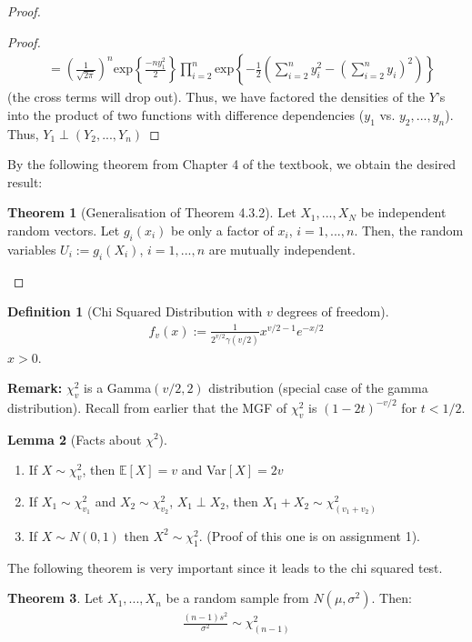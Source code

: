\documentclass[11pt]{scrartcl}
\theoremstyle{definition}
\newtheorem{theorem}{Theorem}
\newtheorem{lemma}[theorem]{Lemma}
\newtheorem{definition}{Definition}
\theoremstyle{remark}
\newcommand{\EX}[1]{\mathbb{E}\left[#1 \right]}
\begin{document}
{\begin{proof}
\begin{proof}
\begin{align*}
			& = \left( 	\frac{1}{\sqrt{2 \pi}}	\right)^n \text{exp} \left\{ 	\frac{-n y_1^2}{2}	\right\} \prod_{i=2}^n \text{exp} \left\{ 	-\frac{1}{2} \left( \sum_{i=2}^n y_i^2 - \left( 	\sum_{i=2}^n y_i \right)^2			\right) 	\right\} 
	\end{align*}
	(the cross terms will drop out). Thus, we have factored the densities of the $Y$'s into the product of two functions with difference dependencies ($y_1$ vs. $y_2, ..., y_n$). 
	Thus, $Y_1 \perp (Y_2, ..., Y_n)$ 
	\end{proof}
	By the following theorem from Chapter 4 of the textbook, we obtain the desired result: 
	\begin{theorem}[Generalisation of Theorem 4.3.2]
			Let $X_1, ..., X_N$ be independent random vectors. Let $g_i(x_i)$ be only a factor of $x_i$, $i=1,..., n$. Then, the random variables $U_i := g_i(X_i)$, $i=1,..., n$ are mutually independent. 
	\end{theorem}
\end{proof}

\begin{definition}[Chi Squared Distribution with $v$ degrees of freedom] 
	\begin{align}
		f_v(x) := \frac{1}{2^{v/2} \gamma (v/2) } x^{v/2 - 1} e^{-x/2} 
	\end{align}
	$x > 0$. 
\end{definition}

\textbf{Remark:} $\chi^2_v$ is a Gamma$(v/2, 2)$ distribution (special case of the gamma distribution). Recall from earlier that the MGF of $\chi_v^2$ is $(1-2t)^{-v/2}$ for $t < 1/2$. 

\begin{lemma}[Facts about $\chi^2$]
	\begin{enumerate}[noitemsep]
		\item  If $X \sim \chi_v^2$, then $\EX{X} = v$ and Var$[X] = 2v$
		\item If $X_1 \sim \chi^2_{v_1}$ and $X_2 \sim \chi^2_{v_2}$, $X_1 \perp X_2$, then $X_1 + X_2 \sim \chi^2_{(v_1 + v_2)}$ 
		\item If $X \sim N(0,1)$ then $X^2 \sim \chi^2_1$. (Proof of this one is on assignment 1). 
	\end{enumerate}
\end{lemma}

The following theorem is very important since it leads to the chi squared test. 

\begin{theorem}
	Let $X_1, ..., X_n$ be a random sample from $N(\mu, \sigma^2)$. Then: 
	\begin{align} 
		\frac{(n-1)s^2}{\sigma^2} \sim \chi^2_{(n-1)}	
	\end{align} 
\end{theorem}

}
\end{document}
